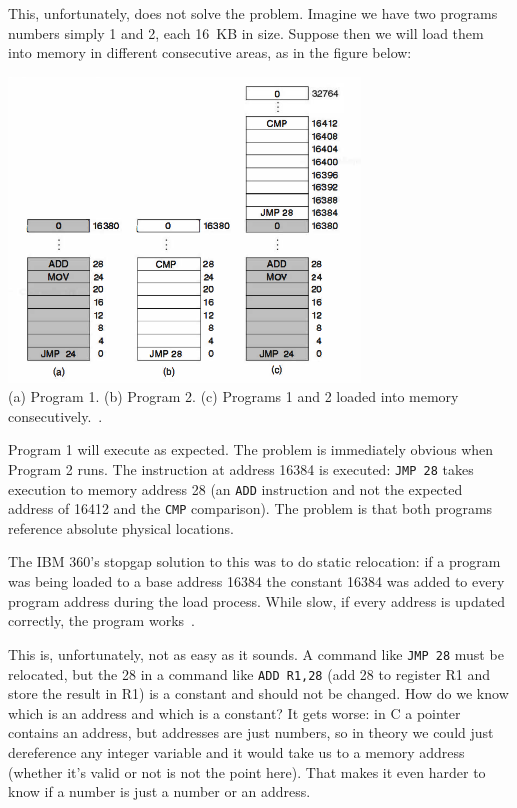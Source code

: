 This, unfortunately, does not solve the problem. Imagine we have two programs numbers simply 1 and 2, each 16~KB in size. Suppose then we will load them into memory in different consecutive areas, as in the figure below:

\begin{center}
\includegraphics[width=0.70\textwidth]{images/os360.png}\\
(a) Program 1. (b) Program 2. (c) Programs 1 and 2 loaded into memory consecutively.~\cite{mos}.
\end{center}

Program 1 will execute as expected. The problem is immediately obvious when Program 2 runs. The instruction at address 16384 is executed: \texttt{JMP 28} takes execution to memory address 28 (an \texttt{ADD} instruction and not the expected address of 16412 and the \texttt{CMP} comparison). The problem is that both programs reference absolute physical locations. 

The IBM 360's stopgap solution to this was to do static relocation: if a program was being loaded to a base address 16384 the constant 16384 was added to every program address during the load process. While slow, if every address is updated correctly, the program works~\cite{mos}.

This is, unfortunately, not as easy as it sounds. A command like \texttt{JMP 28} must be relocated, but the 28 in a command like \texttt{ADD R1,28} (add 28 to register R1 and store the result in R1) is a constant and should not be changed. How do we know which is an address and which is a constant? It gets worse: in C a pointer contains an address, but addresses are just numbers, so in theory we could just dereference any integer variable and it would take us to a memory address (whether it's valid or not is not the point here). That makes it even harder to know if a number is just a number or an address.

